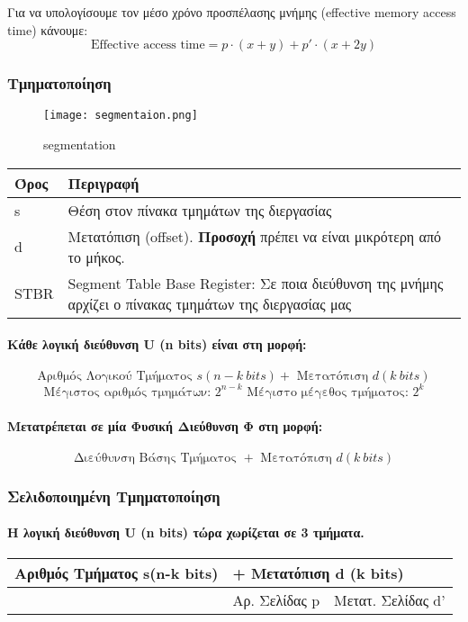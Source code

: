 Για να υπολογίσουμε τον μέσο χρόνο προσπέλασης μνήμης (effective memory access time) κάνουμε:
$$ \text{Effective access time} = p \cdot (x+y) + p' \cdot (x+2y) $$

\subsubsection{Τμηματοποίηση}

\begin{figure}[!ht]
	\centering
	\texttt{[image: segmentaion.png]}
	\caption{segmentation}
\end{figure}

\begin{center}
\begin{tabularx}{0.5\textwidth}{|X|X|}
	\hline
	Όρος & Περιγραφή \\
	\hline
	s & Θέση στον πίνακα τμημάτων της διεργασίας \\
	\hline
	d & Μετατόπιση (offset). \textbf{Προσοχή} πρέπει να είναι μικρότερη από το μήκος. \\
	\hline
	STBR & {Segment Table Base Register: Σε ποια διεύθυνση
	της μνήμης αρχίζει ο πίνακας τμημάτων της διεργασίας μας} \\
	\hline
\end{tabularx}
\end{center}

\paragraph{Κάθε λογική διεύθυνση U (n bits) είναι στη μορφή:}
$$ \text{Αριθμός Λογικού Τμήματος }s (n-k~bits) + \text{ Μετατόπιση } d (k~bits) $$
$$ \text{Μέγιστος αριθμός τμημάτων: } 2^{n-k}\text{  Μέγιστο μέγεθος τμήματος: } 2^k $$
\paragraph{Μετατρέπεται σε μία Φυσική Διεύθυνση Φ στη μορφή:}
$$ \text{Διεύθυνση Βάσης Τμήματος } + \text{ Μετατόπιση } d (k~bits) $$

\subsubsection{Σελιδοποιημένη Τμηματοποίηση}

\paragraph{Η λογική διεύθυνση U (n bits) τώρα χωρίζεται σε 3 τμήματα.}
\begin{center}
\begin{tabularx}{0.95\textwidth}{|X|X|X|}
\hline
Αριθμός Τμήματος s(n-k bits) & \multicolumn{2}{|l|}{ + Μετατόπιση d (k bits)} \\
\hline
{} & Αρ. Σελίδας p & Μετατ. Σελίδας d' \\
\hline
\end{tabularx}
\end{center}

